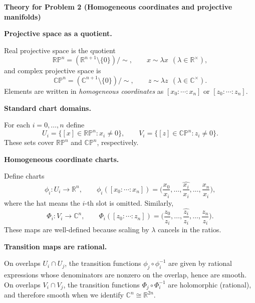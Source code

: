 \begin{solution}


\par\medskip\noindent\textbf{Theory for Problem 2 (Homogeneous coordinates and projective manifolds)}\par\smallskip


\par\medskip\noindent\textbf{Projective space as a quotient.}\par\smallskip

Real projective space is the quotient
\[
\mathbb{RP}^n = (\mathbb R^{n+1}\setminus\{0\})/\sim,
\qquad
x\sim \lambda x \ \ (\lambda\in\mathbb R^\times),
\]
and complex projective space is
\[
\mathbb{CP}^n = (\mathbb C^{n+1}\setminus\{0\})/\sim,
\qquad
z\sim \lambda z \ \ (\lambda\in\mathbb C^\times).
\]
Elements are written in \emph{homogeneous coordinates} as $[x_0:\cdots:x_n]$ or $[z_0:\cdots:z_n]$.

\par\medskip\noindent\textbf{Standard chart domains.}\par\smallskip

For each $i=0,\dots,n$ define
\[
U_i=\{[x]\in\mathbb{RP}^n: x_i\neq 0\},
\qquad
V_i=\{[z]\in\mathbb{CP}^n: z_i\neq 0\}.
\]
These sets cover $\mathbb{RP}^n$ and $\mathbb{CP}^n$, respectively.

\par\medskip\noindent\textbf{Homogeneous coordinate charts.}\par\smallskip

Define charts
\[
\phi_i:U_i\to\mathbb R^n,
\qquad
\phi_i([x_0:\cdots:x_n])=
\Big(\frac{x_0}{x_i},\dots,\widehat{\frac{x_i}{x_i}},\dots,\frac{x_n}{x_i}\Big),
\]
where the hat means the $i$-th slot is omitted.
Similarly,
\[
\Phi_i:V_i\to\mathbb C^n,
\qquad
\Phi_i([z_0:\cdots:z_n])=
\Big(\frac{z_0}{z_i},\dots,\widehat{\frac{z_i}{z_i}},\dots,\frac{z_n}{z_i}\Big).
\]
These maps are well-defined because scaling by $\lambda$ cancels in the ratios.

\par\medskip\noindent\textbf{Transition maps are rational.}\par\smallskip

On overlaps $U_i\cap U_j$, the transition functions $\phi_j\circ\phi_i^{-1}$ are given by rational expressions
whose denominators are nonzero on the overlap, hence are smooth.
On overlaps $V_i\cap V_j$, the transition functions $\Phi_j\circ\Phi_i^{-1}$ are holomorphic (rational),
and therefore smooth when we identify $\mathbb C^n\cong \mathbb R^{2n}$.


\end{solution}
